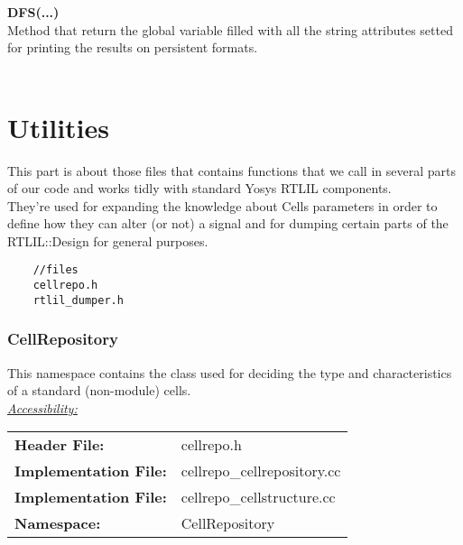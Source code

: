 \documentclass{article}
\newcommand{\sectionbreak}{\clearpage}
\begin{document}
\textbf{DFS(...)}\\
Method that return the global variable filled with all the string attributes setted for printing the results on persistent formats. \\\\

\sectionbreak{\clearpage}


\part{Utilities}

This part is about those files that contains functions that we call in several parts of our code and works tidly with standard Yosys RTLIL components.\\
They're used for expanding the knowledge about Cells parameters in order to define how they can alter (or not) a signal and for dumping certain parts of the RTLIL::Design for general purposes.\\

\begin{mdframed}[hidealllines=true, backgroundcolor=cyan!10]
	\begin{lstlisting}
	//files
	cellrepo.h
	rtlil_dumper.h
	\end{lstlisting}
\end{mdframed}


\sectionbreak{\clearpage}


\section{CellRepository}

This namespace contains the class used for deciding the type and characteristics of a standard (non-module) cells.\\

\underline{\textit{\underline{Accessibility: }}}\\

\begin{tabular}{ll}
	\textbf{Header File:} & cellrepo.h\\
	\textbf{Implementation File:} & cellrepo\_cellrepository.cc\\
	\textbf{Implementation File:} & cellrepo\_cellstructure.cc\\
	\textbf{Namespace: } & CellRepository\\
\end{tabular}\\
\end{document}
